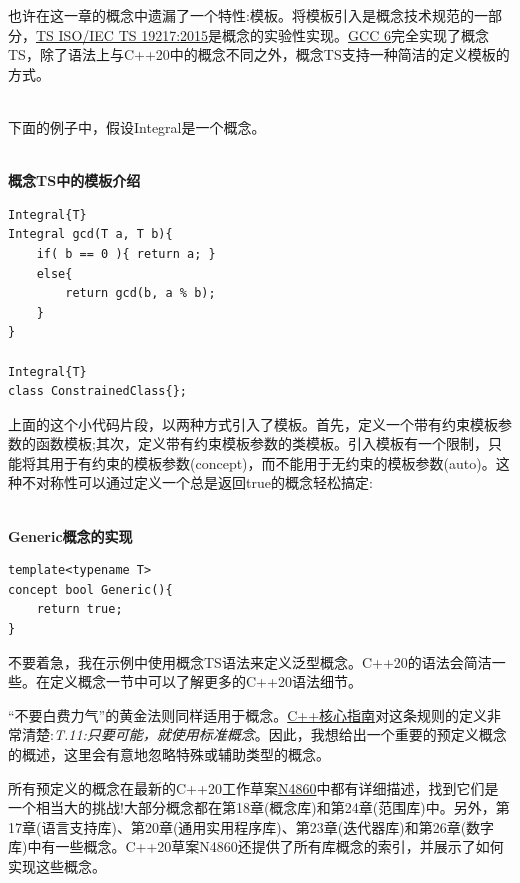 \begin{tcolorbox}[breakable,enhanced jigsaw,colback=blue!5!white,colframe=blue!75!black,title={遗漏的特性:模板}]
也许在这一章的概念中遗漏了一个特性:模板。将模板引入是概念技术规范的一部分，\href{https://www.iso.org/standard/64031.html}{TS ISO/IEC TS 19217:2015}是概念的实验性实现。\href{https://en.wikipedia.org/wiki/GNU_Compiler_Collection}{GCC 6}完全实现了概念TS，除了语法上与C++20中的概念不同之外，概念TS支持一种简洁的定义模板的方式。

\hspace*{\fill} \\ %
下面的例子中，假设Integral是一个概念。

\hspace*{\fill} \\ %
\noindent
\textbf{概念TS中的模板介绍}
\begin{lstlisting}[style=styleCXX]
Integral{T}
Integral gcd(T a, T b){
	if( b == 0 ){ return a; }
	else{
		return gcd(b, a % b);
	}
}

Integral{T}
class ConstrainedClass{};
\end{lstlisting}

上面的这个小代码片段，以两种方式引入了模板。首先，定义一个带有约束模板参数的函数模板;其次，定义带有约束模板参数的类模板。引入模板有一个限制，只能将其用于有约束的模板参数(concept)，而不能用于无约束的模板参数(auto)。这种不对称性可以通过定义一个总是返回true的概念轻松搞定:

\hspace*{\fill} \\ %
\noindent
\textbf{Generic概念的实现}
\begin{lstlisting}[style=styleCXX]
template<typename T>
concept bool Generic(){
	return true;
}
\end{lstlisting}

不要着急，我在示例中使用概念TS语法来定义泛型概念。C++20的语法会简洁一些。在定义概念一节中可以了解更多的C++20语法细节。
\end{tcolorbox}


“不要白费力气”的黄金法则同样适用于概念。\href{https://isocpp.github. io/CppCoreGuidelines/CppCoreGuidelines}{C++核心指南}对这条规则的定义非常清楚:\textit{T.11:只要可能，就使用标准概念}。因此，我想给出一个重要的预定义概念的概述，这里会有意地忽略特殊或辅助类型的概念。

所有预定义的概念在最新的C++20工作草案\href{https://isocpp.org/files/papers/N4860.pdf}{N4860}中都有详细描述，找到它们是一个相当大的挑战!大部分概念都在第18章(概念库)和第24章(范围库)中。另外，第17章(语言支持库)、第20章(通用实用程序库)、第23章(迭代器库)和第26章(数字库)中有一些概念。C++20草案N4860还提供了所有库概念的索引，并展示了如何实现这些概念。

